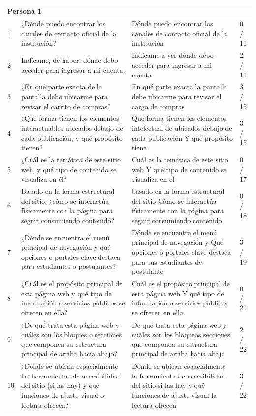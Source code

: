 \begin{longtable}{|p{0.5cm}|p{5.7cm}|p{5.7cm}|p{1.5cm}|}
    \multicolumn{4}{|l|}{\textbf{Persona 1}} \\
    \hline
    1 & ¿Dónde puedo encontrar los canales de contacto oficial de la institución? & Dónde puedo encontrar los canales de contacto oficial de la institución & 0 / 11 \\
    \hline
    2 & Indícame, de haber, dónde debo acceder para ingresar a mi cuenta. & Indícame a ver dónde debo acceder para ingresar a mi cuenta & 2 / 11 \\
    \hline
    3 & ¿En qué parte exacta de la pantalla debo ubicarme para revisar el carrito de compras? & En qué parte exacta la pantalla debe ubicarme para revisar el cargo de compras & 3 / 15 \\
    \hline
    4 & ¿Qué forma tienen los elementos interactuables ubicados debajo de cada publicación, y qué propósito tienen? & Qué forma tienen los elementos intelectual de ubicados debajo de cada publicación Y qué propósito tiene & 3 / 15 \\
    \hline
    5 & ¿Cuál es la temática de este sitio web, y qué tipo de contenido se visualiza en él? & Cuál es la temática de este sitio web Y qué tipo de contenido se visualiza en él & 0 / 17 \\
    \hline
    6 & Basado en la forma estructural del sitio, ¿cómo se interactúa físicamente con la página para seguir consumiendo contenido? & basado en la forma estructural del sitio Cómo se interactúa físicamente con la página para seguir consumiendo contenido & 0 / 18 \\
    \hline
    7 & ¿Dónde se encuentra el menú principal de navegación y qué opciones o portales clave destaca para estudiantes o postulantes? & Dónde se encuentra el menú principal de navegación y Qué opciones o portales clave destaca para sus estudiantes de postulante & 3 / 19 \\
    \hline
    8 & ¿Cuál es el propósito principal de esta página web y qué tipo de información o servicios públicos se ofrecen en ella? & Cuál es el propósito principal de esta página web Y qué tipo de información o servicios públicos se ofrecen en ella & 0 / 21 \\
    \hline
    9 & ¿De qué trata esta página web y cuáles son los bloques o secciones que componen su estructura principal de arriba hacia abajo? & De qué trata esta página web y cuáles son los bloqueos secciones que componen su estructura principal de arriba hacia abajo & 2 / 22 \\
    \hline
    10 & ¿Dónde se ubican espacialmente las herramientas de accesibilidad del sitio (si las hay) y qué funciones de ajuste visual o lectura ofrecen? & Dónde se ubican espacialmente la herramienta de accesibilidad del sitio si las hay y qué funciones de ajuste visual la lectura ofrecen & 3 / 22 \\
    \hline


\end{longtable}
